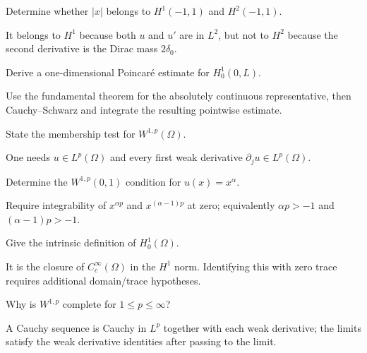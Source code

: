 \begin{problem}\label{prob:iii21-problem-01}
Determine whether \(|x|\) belongs to \(H^1(-1,1)\) and \(H^2(-1,1)\).
\end{problem}
\begin{solution}
It belongs to \(H^1\) because both \(u\) and \(u'\) are in \(L^2\), but not
to \(H^2\) because the second derivative is the Dirac mass \(2\delta_0\).
\end{solution}

\begin{problem}\label{prob:iii21-problem-02}
Derive a one-dimensional Poincaré estimate for \(H_0^1(0,L)\).
\end{problem}
\begin{solution}
Use the fundamental theorem for the absolutely continuous representative,
then Cauchy--Schwarz and integrate the resulting pointwise estimate.
\end{solution}

\begin{problem}\label{prob:iii21-problem-03}
State the membership test for \(W^{1,p}(\Omega)\).
\end{problem}
\begin{solution}
One needs \(u\in L^p(\Omega)\) and every first weak derivative
\(\partial_ju\in L^p(\Omega)\).
\end{solution}

\begin{problem}\label{prob:iii21-problem-04}
Determine the \(W^{1,p}(0,1)\) condition for \(u(x)=x^\alpha\).
\end{problem}
\begin{solution}
Require integrability of \(x^{\alpha p}\) and
\(x^{(\alpha-1)p}\) at zero; equivalently
\(\alpha p>-1\) and \((\alpha-1)p>-1\).
\end{solution}

\begin{problem}\label{prob:iii21-problem-05}
Give the intrinsic definition of \(H_0^1(\Omega)\).
\end{problem}
\begin{solution}
It is the closure of \(C_c^\infty(\Omega)\) in the \(H^1\) norm. Identifying
this with zero trace requires additional domain/trace hypotheses.
\end{solution}

\begin{problem}[Completeness]\label{prob:iii21-problem-06}
Why is \(W^{1,p}\) complete for \(1\le p\le\infty\)?
\end{problem}
\begin{solution}
A Cauchy sequence is Cauchy in \(L^p\) together with each weak derivative;
the limits satisfy the weak derivative identities after passing to the limit.
\end{solution}

